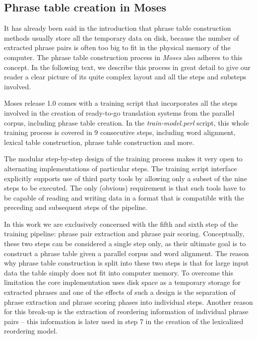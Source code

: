 \subsection{Phrase table creation in Moses}
\label{sec:phrase-table-creation-in-moses}

It has already been said in the introduction that phrase table construction methods
usually store all the temporary data on disk, because the number of extracted
phrase pairs is often too big to fit in the physical memory of the computer.
The phrase table construction process in \emph{Moses} also adheres to this concept.
In the following text, we describe this process in great detail to give our reader
a clear picture of its quite complex layout and all the steps and substeps involved.

Moses release 1.0 comes
with a training script that incorporates all the steps involved in the creation of
ready-to-go translation systems from the parallel corpus, including phrase table creation.
In the \emph{train-model.perl} script, this whole training process is covered in
9 consecutive steps,
including word alignment, lexical table construction, phrase table construction and more.

The modular step-by-step design of the training process makes it very open to
alternating implementations of particular steps.
The training script interface explicitly supports use of third party tools by
allowing only a subset of the nine steps to be executed.
The only (obvious) requirement is that such tools have to be capable of reading and
writing data in a format that is compatible with the preceding and subsequent steps
of the pipeline.

In this work we are exclusively concerned with the fifth and sixth step of
the training pipeline:
phrase pair extraction
and phrase pair scoring.
Conceptually, these two steps can be considered a single step only, as their ultimate
goal is to construct a phrase table given a parallel corpus and word alignment.
The reason why phrase table construction is split into these two steps is that
for large input data the table simply does not fit into computer memory.
To overcome this limitation the core implementation uses disk space as a temporary storage
for extracted phrases and one of the effects of such a design is the separation of
phrase extraction and phrase scoring phases into individual steps.
Another reason for this break-up is the extraction of reordering information
of individual phrase pairs -- this information is later used in step 7 in the creation
of the lexicalized reordering model.

